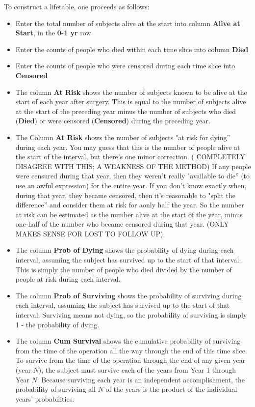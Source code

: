 \documentclass[a4paper,11pt]{article}
\begin{document}
To construct a lifetable, one proceeds as follows:

\begin{itemize}[noitemsep]
\item Enter the total number of subjects alive at the start into column \textbf{Alive at Start}, in the \textbf{0-1 yr} row
\item Enter the counts of people who died within each time slice into column \textbf{Died}
\item Enter the counts of people who were censored during each time slice into \textbf{Censored}
\item The column \textbf{At Risk} shows the number of subjects known to be alive at the start of each year after surgery. This is equal to the number of subjects alive at the start of the preceding year minus the number of subjects who died (\textbf{Died}) or were censored (\textbf{Censored}) during the preceding year. 
\item The Column \textbf{At Risk} shows the number of subjects "at risk for dying'' during each year. You may guess that this is the number of people alive at the start of the interval, but there's one minor correction. ( COMPLETELY DISAGREE WITH THIS; A WEAKNESS OF THE METHOD) If any people were censured during that year, then they weren't really "available to die'' (to use an awful expression) for the entire year. If you don't know exactly when, during that year, they became censored, then it's reasonable to "split the difference'' and consider them at risk for aonly half the year. So the number at risk can be estimated as the number alive at the start of the year, minus one-half of the number who became censored during that year. (ONLY MAKES SENSE FOR LOST TO FOLLOW UP).
\item The column \textbf{Prob of Dying} shows the probability of dying during each interval, assuming the subject has survived up to the start of that interval. This is simply the number of people who died divided by the number of people at risk during each interval. 
\item The column \textbf{Prob of Surviving} shows the probability of surviving during each interval, assuming the subject has survived up to the start of that interval. Surviving means not dying, so the probability of surviving is simply 1 - the probability of dying.
\item The column \textbf{Cum Survival} shows the cumulative probability of surviving from the time of the operation all the way through the end of this time slice. To survive from the time of the operation through the end of any given year (year $N$), the subject must survive each of the years from Year 1 through Year $N$. Because surviving each year is an independent accomplishment, the probability of surviving all $N$ of the years is the product of the individual years' probabilities.
\end{itemize}
\end{document}
